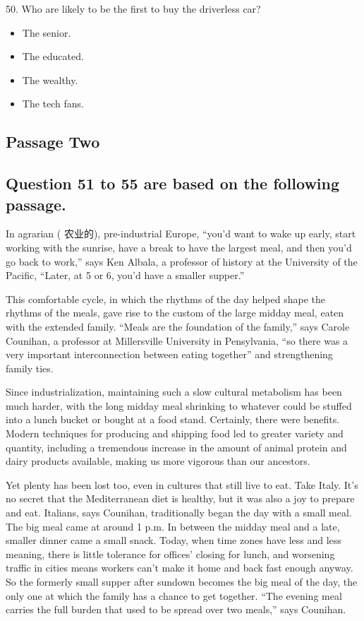 \documentclass[UTF8,11pt]{ctexart}
\begin{document}
50. Who are likely to be the first to buy the driverless car?


\begin{itemize}[leftmargin=2em,itemsep=.2em,topsep=.4em]\item[A.] The senior.
\item[B.] The educated.
\item[C.] The wealthy.
\item[D.] The tech fans.
\end{itemize}

\subsection*{Passage Two}


\subsection*{\textbf{Question 51 to 55 are based on the following passage.}}


In agrarian ( 农业的), pre-industrial Europe, “you’d want to wake up early, start working with the sunrise, have a break to have the largest meal, and then you’d go back to work,” says Ken Albala, a professor of history at the University of the Pacific, “Later, at 5 or 6, you’d have a smaller supper.”


This comfortable cycle, in which the rhythms of the day helped shape the rhythms of the meals, gave rise to the custom of the large midday meal, eaten with the extended family. “Meals are the foundation of the family,” says Carole Counihan, a professor at Millersville University in Pensylvania, “so there was a very important interconnection between eating together” and strengthening family ties.


Since industrialization, maintaining such a slow cultural metabolism has been much harder, with the long midday meal shrinking to whatever could be stuffed into a lunch bucket or bought at a food stand. Certainly, there were benefits. Modern techniques for producing and shipping food led to greater variety and quantity, including a tremendous increase in the amount of animal protein and dairy products available, making us more vigorous than our ancestors.


Yet plenty has been lost too, even in cultures that still live to eat. Take Italy. It’s no secret that the Mediterranean diet is healthy, but it was also a joy to prepare and eat. Italians, says Counihan, traditionally began the day with a small meal. The big meal came at around 1 p.m. In between the midday meal and a late, smaller dinner came a small snack. Today, when time zones have less and less meaning, there is little tolerance for offices’ closing for lunch, and worsening traffic in cities means workers can’t make it home and back fast enough anyway. So the formerly small supper after sundown becomes the big meal of the day, the only one at which the family has a chance to get together. “The evening meal carries the full burden that used to be spread over two meals,” says Counihan.
\end{document}
